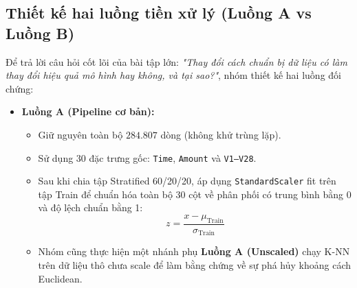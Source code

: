 \documentclass[13pt,a4paper]{extarticle}
\begin{document}
\subsection{Thiết kế hai luồng tiền xử lý (Luồng A vs Luồng B)}
Để trả lời câu hỏi cốt lõi của bài tập lớn: \textit{"Thay đổi cách chuẩn bị dữ liệu có làm thay đổi hiệu quả mô hình hay không, và tại sao?"}, nhóm thiết kế hai luồng đối chứng:

\begin{itemize}
    \item \textbf{Luồng A (Pipeline cơ bản):}
    \begin{itemize}
        \item Giữ nguyên toàn bộ $284.807$ dòng (không khử trùng lặp).
        \item Sử dụng 30 đặc trưng gốc: \texttt{Time}, \texttt{Amount} và \texttt{V1--V28}.
        \item Sau khi chia tập Stratified 60/20/20, áp dụng \texttt{StandardScaler} fit trên tập Train để chuẩn hóa toàn bộ 30 cột về phân phối có trung bình bằng 0 và độ lệch chuẩn bằng 1:
        \begin{equation}
        z = \frac{x - \mu_{\text{Train}}}{\sigma_{\text{Train}}}
        \end{equation}
        \item Nhóm cũng thực hiện một nhánh phụ \textbf{Luồng A (Unscaled)} chạy K-NN trên dữ liệu thô chưa scale để làm bằng chứng về sự phá hủy khoảng cách Euclidean.
    \end{itemize}


\end{itemize}
\end{document}
